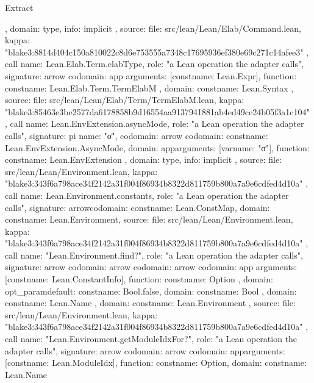 \begin{lexlean}{Extract}
\begin{toolingmodule}
{{{{        },
        domain: type{},
        info: implicit
      },
      source: {
        file: src/lean/Lean/Elab/Command.lean,
        kappa: "blake3:8814d404c150a810022c8d6e753555a7348c17695936ef380e69c271c14afee3"
      }
    },
    call{
      name: Lean.Elab.Term.elabType,
      role: "a Lean operation the adapter calls",
      signature: arrow{
        codomain: app{
          arguments: [const{name: Lean.Expr}],
          function: const{name: Lean.Elab.Term.TermElabM}
        },
        domain: const{name: Lean.Syntax}
      },
      source: {
        file: src/lean/Lean/Elab/Term/TermElabM.lean,
        kappa: "blake3:85463e3be2577da6178858b9d16554aa9137941881ab4ed49ce24b05f3a1c104"
      }
    },
    call{
      name: Lean.EnvExtension.asyncMode,
      role: "a Lean operation the adapter calls",
      signature: pi{
        name: "σ",
        codomain: arrow{
          codomain: const{name: Lean.EnvExtension.AsyncMode},
          domain: app{arguments: [var{name: "σ"}], function: const{name: Lean.EnvExtension}}
        },
        domain: type{},
        info: implicit
      },
      source: {
        file: src/lean/Lean/Environment.lean,
        kappa: "blake3:343f6a798ace34f2142a31f004f86934b8322d811759b800a7a9e6cdfed4d10a"
      }
    },
    call{
      name: Lean.Environment.constants,
      role: "a Lean operation the adapter calls",
      signature: arrow{codomain: const{name: Lean.ConstMap}, domain: const{name: Lean.Environment}},
      source: {
        file: src/lean/Lean/Environment.lean,
        kappa: "blake3:343f6a798ace34f2142a31f004f86934b8322d811759b800a7a9e6cdfed4d10a"
      }
    },
    call{
      name: "Lean.Environment.find?",
      role: "a Lean operation the adapter calls",
      signature: arrow{
        codomain: arrow{
          codomain: arrow{
            codomain: app{
              arguments: [const{name: Lean.ConstantInfo}],
              function: const{name: Option}
            },
            domain: opt_param{default: const{name: Bool.false}, domain: const{name: Bool}}
          },
          domain: const{name: Lean.Name}
        },
        domain: const{name: Lean.Environment}
      },
      source: {
        file: src/lean/Lean/Environment.lean,
        kappa: "blake3:343f6a798ace34f2142a31f004f86934b8322d811759b800a7a9e6cdfed4d10a"
      }
    },
    call{
      name: "Lean.Environment.getModuleIdxFor?",
      role: "a Lean operation the adapter calls",
      signature: arrow{
        codomain: arrow{
          codomain: app{arguments: [const{name: Lean.ModuleIdx}], function: const{name: Option}},
          domain: const{name: Lean.Name}
}}}}
\end{toolingmodule}
\end{lexlean}
